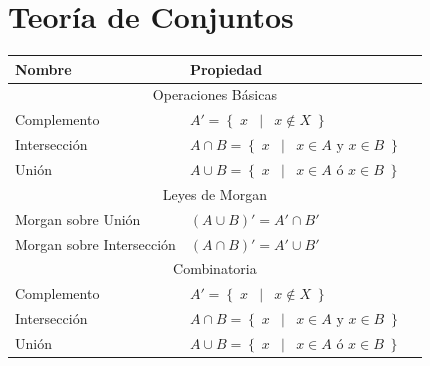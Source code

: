 \documentclass[12pt, fleqn]{report}                             %
\DeclareMathOperator \Space     {\quad}                         %
\DeclareMathOperator \MiniSpace {\;}                            %
\newcommand \Such           {\MiniSpace | \MiniSpace}           %
\theoremstyle{break}                                            %
\newcommand{\Set}[1]            {\left\{ \; #1 \; \right\}}     %
\begin{document}
        \section{Teoría de Conjuntos}

            \begin{table}[ht]
                \begin{tabular}{|m{16em}|m{16em}|@{}m{0pt}@{}}
                    \hline
                    \large{Nombre}          & \large{Propiedad}                             &\\[2em]    \hline\hline

                    \multicolumn{3}{|c|}{Operaciones Básicas}                                \\         \hline
                    Complemento  & $A' = \Set{x \Such x \notin X}$                          &\\[1em]    \hline
                    Intersección & $A \cap B = \Set{x \Such x \in A \text{ y } x \in B}$    &\\[1em]    \hline
                    Unión        & $A \cup B = \Set{x \Such x \in A \text{ ó } x \in B}$    &\\[1em]    \hline\hline

                    \multicolumn{3}{|c|}{Leyes de Morgan}                                    \\         \hline
                    Morgan sobre Unión          & $(A \cup B)' = A' \cap B'$                &\\[1em]    \hline
                    Morgan sobre Intersección   & $(A \cap B)' = A' \cup B'$                &\\[1em]    \hline\hline

                    \multicolumn{3}{|c|}{Combinatoria}                                       \\         \hline
                    Complemento  & $A' = \Set{x \Such x \notin X}$                          &\\[1em]    \hline
                    Intersección & $A \cap B = \Set{x \Such x \in A \text{ y } x \in B}$    &\\[1em]    \hline
                    Unión        & $A \cup B = \Set{x \Such x \in A \text{ ó } x \in B}$    &\\[1em]    \hline\hline
                  
                \end{tabular}
            \end{table}
\end{document}
